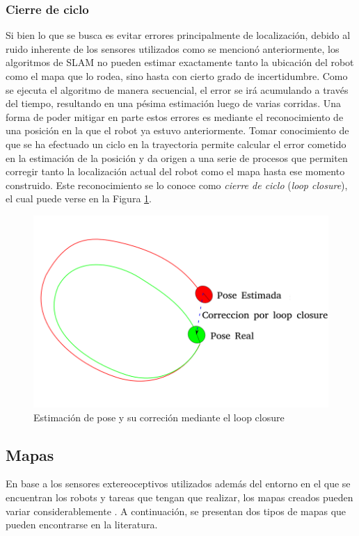 \subsubsection{Cierre de ciclo}
Si bien lo que se busca es evitar errores principalmente de localización, debido al ruido inherente de los sensores utilizados como se mencionó anteriormente, los algoritmos de SLAM no pueden estimar exactamente tanto la ubicación del robot como el mapa que lo rodea, sino hasta con cierto grado de incertidumbre. Como se ejecuta el algoritmo de manera secuencial, el error se irá acumulando a través del tiempo, resultando en una pésima estimación luego de varias corridas. Una forma de poder mitigar en parte estos errores es mediante el reconocimiento de una posición en la que el robot ya estuvo anteriormente. Tomar conocimiento de que se ha efectuado un ciclo en la trayectoria permite calcular el error cometido en la estimación de la posición y da origen a una serie de procesos que permiten corregir tanto la localización actual del robot como el mapa hasta ese momento construido. Este reconocimiento se lo conoce como \textit{cierre de ciclo} (\textit{loop closure}), el cual puede verse en la Figura \ref{fig:poseloopclcorr}.


\begin{figure}[!ht]
    \centering
    \includegraphics[width=\textwidth]{Img/Pose_LoopClosureCorr.png}
    \caption{Estimación de pose y su correción mediante el loop closure}
    \label{fig:poseloopclcorr}
\end{figure}

\subsection{Mapas}
En base a los sensores extereoceptivos utilizados además del entorno en el que se encuentran los robots y tareas que tengan que realizar, los mapas creados pueden variar considerablemente \cite{thrun2002}\cite{siciliano2008}\cite{thrun2005}. A continuación, se presentan dos tipos de mapas que pueden encontrarse en la literatura.


